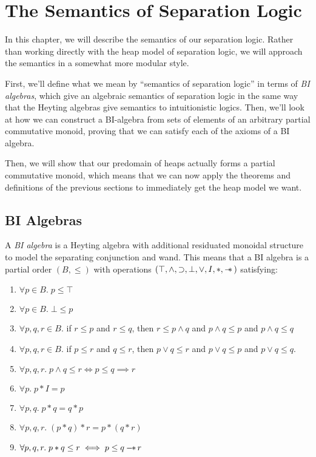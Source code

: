 \chapter{The Semantics of Separation Logic}

In this chapter, we will describe the semantics of our separation
logic. Rather than working directly with the heap model of separation
logic, we will approach the semantics in a somewhat more modular
style.

First, we'll define what we mean by ``semantics of separation logic''
in terms of \emph{BI algebras}, which give an algebraic semantics of
separation logic in the same way that the Heyting algebras give
semantics to intuitionistic logics. Then, we'll look at how we can
construct a BI-algebra from sets of elements of an arbitrary partial
commutative monoid, proving that we can satisfy each of the axioms of
a BI algebra.

Then, we will show that our predomain of heaps actually forms a
partial commutative monoid, which means that we can now apply the
theorems and definitions of the previous sections to immediately get
the heap model we want.

\section{BI Algebras}

A \emph{BI algebra} is a Heyting algebra with additional residuated
monoidal structure to model the separating conjunction and wand. This
means that a BI algebra is a partial order $(B, \leq)$ with operations
$(\top, \land, \supset, \bot, \vee, I, *, -\!\!*\,)$ satisfying:

\begin{enumerate}
\item $\forall p \in B.\; p \leq \top$
\item $\forall p \in B.\; \bot \leq p$
\item $\forall p,q,r \in B.$ if $r \leq p$ and $r \leq q$, then
      $r \leq p \land q$ and 
      $p \land q \leq p$ and $p \land q \leq q$
\item $\forall p,q,r \in B.$ if $p \leq r$ and $q \leq r$, then
      $p \vee q \leq r$ and
      $p \vee q \leq p$ and $p \vee q \leq q$.
\item $\forall p, q, r.\; p \land q \leq r \iff p \leq q \implies r$
\item $\forall p.\; p * I = p$
\item $\forall p, q.\; p * q = q * p$
\item $\forall p, q, r.\; (p * q) * r = p * (q * r)$
\item $\forall p, q, r.\; p * q \leq r \iff p \leq q -\!\!*\, r$
\end{enumerate}

